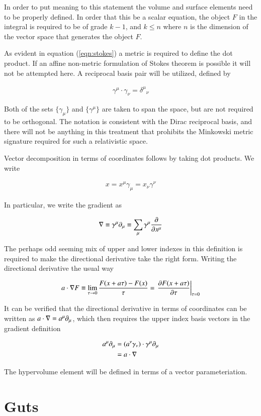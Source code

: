 In order to put meaning to this statement the volume and surface elements need to be properly defined.  In order that this be a scalar equation, the object $F$ in the integral is required to be of grade $k-1$, and $k \le n$ where $n$ is the dimension of the vector space that generates the object $F$.

As evident in equation (\ref{eqn:stokes}) a metric is required to define the dot product.  If an affine non-metric formulation
of Stokes theorem is possible it will not be attempted here.  A reciprocal basis pair will be utilized, defined by

\begin{align}
\gamma^\mu \cdot \gamma_\nu = {\delta^\mu}_\nu
\end{align}

Both of the sets $\{\gamma_\mu\}$ and $\{\gamma^\mu\}$ are taken to span the space, but are not required to be orthogonal.  The notation is consistent with the Dirac reciprocal basis, and there will not be anything in this treatment that prohibits the Minkowski metric signature required for such a relativistic space.

Vector decomposition in terms of coordinates follows by taking dot products.  We write

\begin{align}
x = x^\mu \gamma_\mu = x_\nu \gamma^\nu
\end{align}

In particular, we write the gradient as

\begin{align}
\nabla \equiv \gamma^\mu \partial_\mu \equiv \sum_\mu \gamma^\mu \frac{\partial {}}{\partial {x^\mu}}
\end{align}

The perhaps odd seeming mix of upper and lower indexes in this definition is required to make the directional derivative take the right form.  Writing the directional derivative the usual way

\begin{align}
a \cdot \nabla F \equiv \lim_{\tau \rightarrow 0} \frac{F(x + a\tau) - F(x)}{\tau} = {\left.\frac{\partial {F(x + a\tau)}}{\partial {\tau}} \right\vert}_{\tau=0}
\end{align}

It can be verified that the directional derivative in terms of coordinates can be written as $a \cdot \nabla = a^\mu \partial_\mu$, which then requires the upper index basis vectors in the gradient definition

\begin{align*}
a^\mu \partial_\mu 
&= (a^\nu \gamma_\nu) \cdot \gamma^\mu \partial_\mu \\
&= a \cdot \nabla 
\end{align*}

The hypervolume element will be defined in terms of a vector parameteriation.

\section{Guts}

\EndArticle
